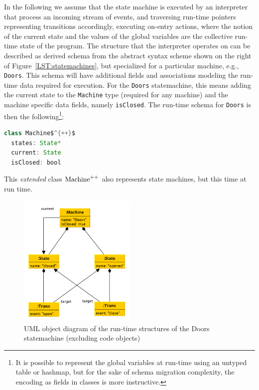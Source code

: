 \documentclass[english,submission]{programming}
\begin{document}
In the following we assume that the state machine is executed by an interpreter that process an incoming stream of events, and traversing run-time pointers representing transitions accordingly, executing on-entry actions, where the notion of the current state and the values of the global variables are the collective run-time state of the program. The structure that the interpreter operates on can be described as derived  schema from the abstract syntax scheme shown on the right of Figure~\ref{LST:statemachines}, but specialized for a particular machine, e.g., \lstinline{Doors}.
This schema will have additional fields and associations modeling the run-time data required for execution. For the \lstinline{Doors} statemachine, this means adding the current state to the \lstinline{Machine} type (required for any machine) and the machine specific data fields, namely \lstinline{isClosed}. The run-time schema for \lstinline{Doors} is then the following\footnote{It is possible to represent the global variables at run-time using an untyped table or hashmap, but for the sake of schema migration complexity, the encoding as fields in classes is more instructive.}:

\begin{lstlisting}[language=java,morekeywords={on},mathescape=true]
class Machine$^{++}$
  states: State*
  current: State
  isClosed: bool
\end{lstlisting}

This \textit{extended} class $\text{\lstinline{Machine}}^{++}$ also represents state machines, but this time at run time.



\begin{figure}[t]
  \centering
\includegraphics[width=0.5\textwidth]{figures/doorsmachine.pdf}
\caption{UML object diagram of the run-time structures of the Doors statemachine (excluding code objects)}
\label{FIG:doorsRuntime}
\end{figure}
\end{document}
